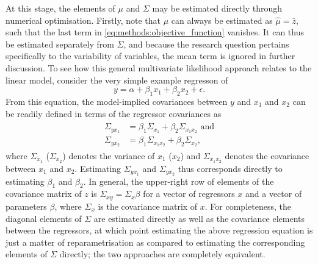 At this stage, the elements of $\mu$ and $\Sigma$ may be estimated directly through numerical optimisation.
Firstly, note that $\mu$ can always be estimated as $\hat{\mu} = \bar{z}$, such that the last term in
\cref{eq:methods:objective_function} vanishes. It can thus be estimated separately from $\Sigma$,
and because the research question pertains specifically to the variability of variables,
the mean term is ignored in further discussion.
To see how this general multivariate likelihood approach relates to the linear model, consider the very simple example
regresson of
\begin{equation}
    \label{eq:methods:simple_regression}
    y = \alpha + \beta_1 x_1 + \beta_2 x_2 + \epsilon.
\end{equation}
From this equation, the model-implied covariances between $y$
and $x_1$ and $x_2$ can be readily defined in terms of the regressor covariances as
\begin{align}
\begin{split}
    \label{eq:methods:covariance_simple_regression}
    \Sigma_{y x_1} &= \beta_1 \Sigma_{x_1} + \beta_2 \Sigma_{x_1 x_2}\text{ and} \\
    \Sigma_{y x_2} &= \beta_1 \Sigma_{x_1 x_2} + \beta_2 \Sigma_{x_2},
\end{split}
\end{align}
where $\Sigma_{x_1}$ ($\Sigma_{x_2}$) denotes the variance of $x_1$ ($x_2$) and $\Sigma_{x_1 x_2}$ denotes the covariance between $x_1$ and $x_2$.
Estimating $\Sigma_{y x_1}$ and $\Sigma_{y x_2}$ thus corresponds directly to estimating $\beta_1$ and $\beta_2$.
In general, the upper-right row of elements of the covariance matrix of $z$ is $\Sigma_{xy} = \Sigma_x \beta$ for
a vector of regressors $x$ and a vector of parameters $\beta$, where $\Sigma_x$ is the covariance matrix of $x$.
For completeness, the diagonal elements of $\Sigma$ are estimated directly as well as the covariance elements between
the regressors, at which point estimating the above regression equation is just a matter of reparametrisation as compared
to estimating the corresponding elements of $\Sigma$ directly; the two approaches are completely equivalent.

